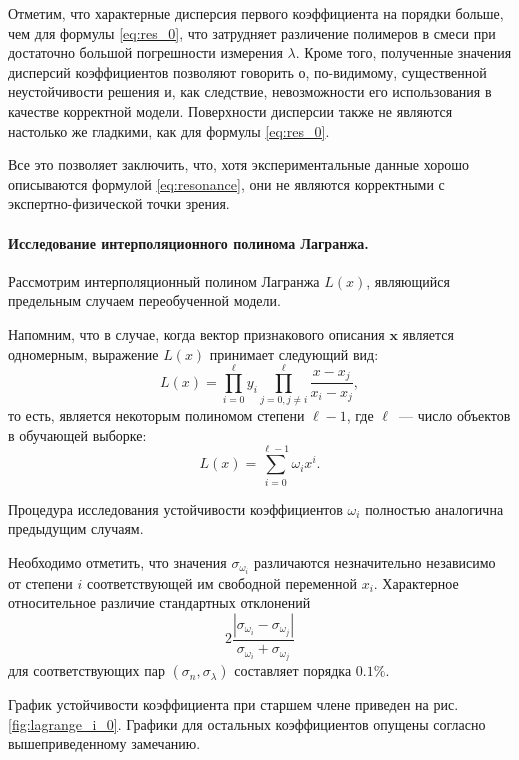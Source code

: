 \documentclass[12pt,a4paper]{article}
\begin{document}
Отметим, что характерные дисперсия первого коэффициента на порядки больше, чем
для формулы \eqref{eq:res_0}, что затрудняет различение полимеров в смеси при
достаточно большой погрешности измерения $\lambda$. Кроме того, полученные значения
дисперсий коэффициентов позволяют говорить о, по-видимому, существенной неустойчивости
решения и, как следствие, невозможности его использования в качестве корректной модели.
Поверхности дисперсии также не являются настолько же гладкими, как для формулы
\eqref{eq:res_0}.

Все это позволяет заключить, что, хотя экспериментальные данные хорошо
описываются формулой \eqref{eq:resonance}, они не являются корректными с
экспертно-физической точки зрения.

\paragraph{Исследование интерполяционного полинома Лагранжа.}

Рассмотрим интерполяционный полином Лагранжа $L(x)$, являющийся предельным случаем
переобученной модели.

Напомним, что в случае, когда вектор признакового описания $\mathbf{x}$
является одномерным, выражение $L(x)$ принимает следующий вид:
\[
L(x) = \prod_{i = 0}^\ell y_i \prod_{j = 0, j \neq i}^\ell \frac{x - x_j}{x_i - x_j},
\]
то есть, является некоторым полиномом степени $\ell - 1$, где $\ell$~--- число
объектов в обучающей выборке:
\begin{equation}
  L(x) = \sum_{i = 0}^{\ell - 1} \omega_i x^i.
  \label{eq:lagrange}
\end{equation}

Процедура исследования устойчивости коэффициентов $\omega_i$ полностью аналогична
предыдущим случаям.

Необходимо отметить, что значения $\sigma_{\omega_i}$ различаются незначительно
независимо от степени $i$ соответствующей им свободной переменной $x_i$. Характерное
относительное различие стандартных отклонений
\[
2 \frac{|\sigma_{\omega_i} - \sigma_{\omega_j}|}{\sigma_{\omega_i} + \sigma_{\omega_j}}
\]
для соответствующих пар $(\sigma_n, \sigma_\lambda)$ составляет порядка $0.1\%$.

График устойчивости коэффициента при старшем члене приведен на рис. \ref{fig:lagrange_i_0}.
Графики для остальных коэффициентов опущены согласно вышеприведенному замечанию.
\end{document}
